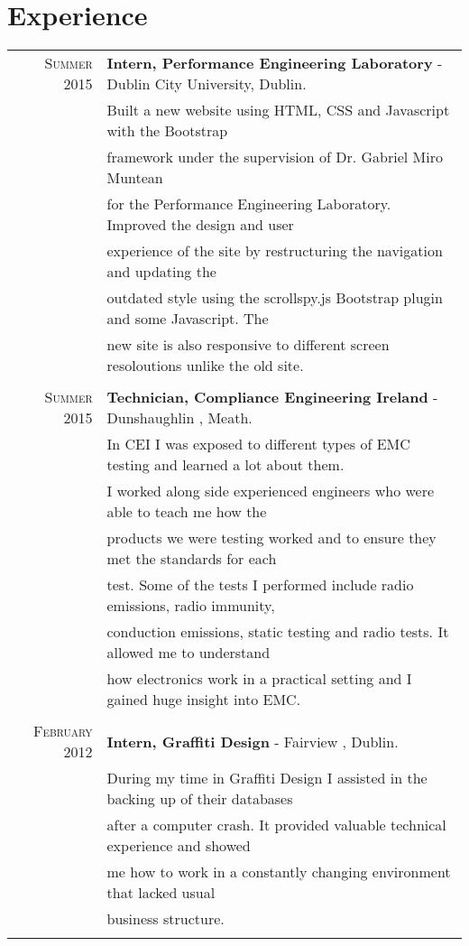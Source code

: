 \documentclass[a4paper,10pt]{article}
\begin{document}
\section{\textbf{Experience}}
\begin{tabular}{rl}	
\textsc{Summer} 2015 & \textbf{Intern, Performance Engineering Laboratory} - Dublin City University, Dublin.\\
& Built a new website using HTML, CSS and Javascript with the Bootstrap \\
& framework under the supervision of Dr. Gabriel Miro Muntean \\
& for the Performance Engineering Laboratory.
Improved the design and user \\
& experience of the site by restructuring the navigation and updating the \\
& outdated style using the scrollspy.js Bootstrap plugin and some Javascript. The \\
& new site is also responsive to different screen resoloutions unlike the old site.\\&\\

\textsc{Summer} 2015 & \textbf{Technician, Compliance Engineering Ireland} - Dunshaughlin , Meath.\\
& In CEI I was exposed to different types of EMC testing and learned a lot about them. \\
& I worked along side experienced engineers who were able to teach me how the \\
& products we were testing worked and to ensure they met the standards for each \\
& test. Some of the tests I performed include radio emissions, radio immunity, \\
& conduction emissions, static testing and radio tests. It allowed me to understand \\
& how electronics work in a practical setting and I gained huge insight into EMC.\\&\\

\textsc{February} 2012 & \textbf{Intern, Graffiti Design} - Fairview , Dublin.\\
& During my time in Graffiti Design I assisted in the backing up of their databases\\
& after a computer crash. It provided valuable technical experience and showed \\
& me how to work in a constantly changing environment that lacked usual\\
& business structure.\\&\\
\end{tabular}
\end{document}
